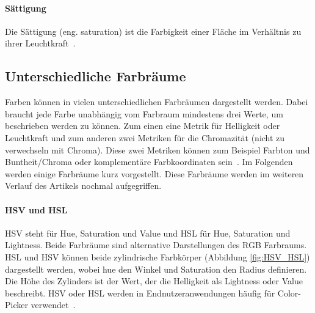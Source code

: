 \documentclass[12pt, a4paper, ngerman]{article}
\begin{document}
\paragraph{Sättigung}
Die Sättigung (eng. saturation) ist die Farbigkeit einer Fläche im Verhältnis zu ihrer Leuchtkraft~\cite{Darktable_2023}.


\subsection{Unterschiedliche Farbräume}
Farben können in vielen unterschiedlichen Farbräumen dargestellt werden. 
Dabei braucht jede Farbe unabhängig vom Farbraum mindestens drei Werte, um beschrieben werden zu können.
Zum einen eine Metrik für Helligkeit oder Leuchtkraft und zum anderen zwei Metriken für die Chromazität 
(nicht zu verwechseln mit Chroma). 
Diese zwei Metriken können zum Beispiel Farbton und Buntheit/Chroma oder komplementäre Farbkoordinaten sein~\cite{Darktable_2023}.
Im Folgenden werden einige Farbräume kurz vorgestellt. Diese Farbräume werden im weiteren Verlauf des Artikels nochmal aufgegriffen.

\paragraph{HSV und HSL}
\acs{HSV} steht für Hue, Saturation und Value und \acs{HSL} für Hue, Saturation und Lightness.
Beide Farbräume sind alternative Darstellungen des RGB Farbraums. 
HSL und HSV können beide zylindrische Farbkörper (Abbildung \ref{fig:HSV_HSL}) dargestellt werden, 
wobei hue den Winkel und Saturation den Radius definieren.
Die Höhe des Zylinders ist der Wert, der die Helligkeit als Lightness oder Value beschreibt.
HSV oder HSL werden in Endnutzeranwendungen häufig für Color-Picker verwendet~\cite{HSL_and_HSV_2023}.
\end{document}
